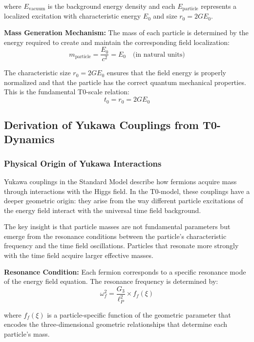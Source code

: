 \documentclass[12pt,a4paper]{article}
\newcommand{\Tzero}{t_0}
\newcommand{\xigeom}{\xi}
\begin{document}
	where $E_{\text{vacuum}}$ is the background energy density and each $E_{\text{particle}}$ represents a localized excitation with characteristic energy $E_0$ and size $r_0 = 2GE_0$.
	
	\textbf{Mass Generation Mechanism:} The mass of each particle is determined by the energy required to create and maintain the corresponding field localization:
	\begin{equation}
		m_{\text{particle}} = \frac{E_0}{c^2} = E_0 \quad \text{(in natural units)}
	\end{equation}
	
	The characteristic size $r_0 = 2GE_0$ ensures that the field energy is properly normalized and that the particle has the correct quantum mechanical properties. This is the fundamental T0-scale relation:
	\begin{equation}
		\Tzero = r_0 = 2GE_0
	\end{equation}
	
	\subsection{Derivation of Yukawa Couplings from T0-Dynamics}
	
	\subsubsection{Physical Origin of Yukawa Interactions}
	
	Yukawa couplings in the Standard Model describe how fermions acquire mass through interactions with the Higgs field. In the T0-model, these couplings have a deeper geometric origin: they arise from the way different particle excitations of the energy field interact with the universal time field background.
	
	The key insight is that particle masses are not fundamental parameters but emerge from the resonance conditions between the particle's characteristic frequency and the time field oscillations. Particles that resonate more strongly with the time field acquire larger effective masses.
	
	\textbf{Resonance Condition:} Each fermion corresponds to a specific resonance mode of the energy field equation. The resonance frequency is determined by:
	\begin{equation}
		\omega_f^2 = \frac{G_3}{\ell_P^2} \times f_f(\xigeom)
	\end{equation}
	
	where $f_f(\xigeom)$ is a particle-specific function of the geometric parameter that encodes the three-dimensional geometric relationships that determine each particle's mass.
	
\end{document}
